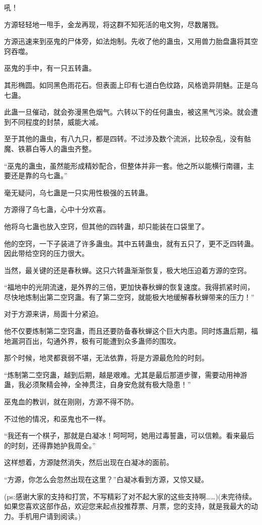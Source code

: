 \begin{this_body}
吼！

方源轻轻地一甩手，金龙再现，将这群不知死活的电文狗，尽数屠戮。

方源迅速来到巫鬼的尸体旁，如法炮制。先收了他的蛊虫，又用兽力胎盘蛊将其空窍吞噬。

巫鬼的手中，有一只五转蛊。

其形椭圆。如同黑色雨花石。但表面上印有七道白色纹路，风格诡异阴魅。正是乌七蛊。

此蛊一旦催动，就会弥漫黑色烟气。六转以下的任何蛊虫，被这黑气污染。就会遭到不同程度的封禁，威能大减。

至于其他的蛊虫，有八九只，都是四转。不过涉及数个流派，比较杂乱，没有骷魔、铁慕白等人的蛊虫齐整。

“巫鬼的蛊虫，虽然能形成精妙配合，但整体并非一套。他之所以能横行南疆，主要还是靠的乌七蛊。”

毫无疑问，乌七蛊是一只实用性极强的五转蛊。

方源得了乌七蛊，心中十分欢喜。

他将乌七蛊也放入空窍，但其他的四转蛊，却只能装在口袋里了。

他的空窍，一下子装进了许多蛊虫。其中五转蛊虫，就有五只了，更不乏四转蛊。因此带给空窍的压力很大。

当然，最关键的还是春秋蝉。这只六转蛊渐渐恢复，极大地压迫着方源的空窍。

“福地中的光阴流速，是外界的三倍，更加快春秋蝉的恢复速度。我得抓紧时间，尽快地炼制出第二空窍蛊。有了第二空窍，就能极大地缓解春秋蝉带来的压力！”

对于方源来讲，局面十分紧迫。

他不仅要炼制第二空窍蛊，而且还要防备春秋蝉这个巨大内患。同时炼蛊后期，福地漏洞百出，勾通外界，极有可能遭到众多蛊师的围攻。

那个时候，地灵都衰弱不堪，无法依靠，将是方源最危险的时刻。

“炼制第二空窍蛊，越到后期，越是艰难。尤其是最后那道步骤，需要动用神游蛊，我必须聚精会神，全神贯注，自身安危就有极大隐患！”

巫鬼血的教训，就在刚刚，方源不得不防。

不过他的情况，和巫鬼也不一样。

“我还有一个棋子，那就是白凝冰！呵呵呵，她用过毒誓蛊，可以信赖。看来最后的时刻，还得靠她护我周全。”

这样想着，方源陡然消失，然后出现在白凝冰的面前。

“方源，你怎么会忽然出现在这里？”白凝冰看到方源，又惊又疑。

(ps:感谢大家的支持和打赏，不写精彩了对不起大家的这些支持啊……)(未完待续。如果您喜欢这部作品，欢迎您来起点投推荐票、月票，您的支持，就是我最大的动力。手机用户请到阅读。)

\end{this_body}

